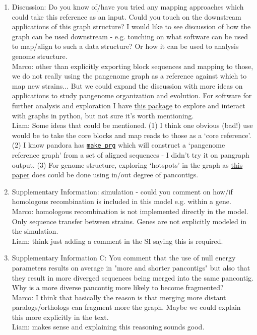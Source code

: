 \documentclass[aps,rmp,onecolumn]{revtex4-1}
\newcommand{\Marco}[1]{{\color{gray}Marco: #1}}
\newcommand{\Liam}[1]{{\color{teal}Liam: #1}}
\begin{document}
\begin{enumerate}
      \item Discussion: Do you know of/have you tried any mapping approaches which could take this reference as an input. Could you touch on the downstream applications of this graph structure? I would like to see discussion of how the graph can be used downstream - e.g. touching on what software can be used to map/align to such a data structure? Or how it can be used to analysis genome structure.\\
            \Marco{other than explicitly exporting block sequences and mapping to those, we do not really using the pangenome graph as a reference against which to map new strains... But we could expand the discussion with more ideas on applications to study pangenome organization and evolution. For software for further analysis and exploration I have \href{https://github.com/mmolari/pypangraph}{this package} to explore and interact with graphs in python, but not sure it's worth mentioning.}\\
            \Liam{Some ideas that could be mentioned. (1) I think one obvious (bad!) use would be to take the core blocks and map reads to those as a `core reference'. (2) I know pandora has \href{https://github.com/iqbal-lab-org/make_prg/}{\texttt{make\_prg}} which will construct a `pangenome reference graph' from a set of aligned sequences - I didn't try it on pangraph output. (3) For genome structure, exploring `hotspots' in the graph as \href{https://www.nature.com/articles/s41467-017-00808-w}{this paper} does could be done using in/out degree of pancontigs.}

      \item Supplementary Information: simulation - could you comment on how/if homologous recombination is included in this model e.g. within a gene.\\
            \Marco{homologous recombination is not implemented directly in the model. Only sequence transfer between strains. Genes are not explicitly modeled in the simulation.}\\
            \Liam{think just adding a comment in the SI saying this is required.}

      \item Supplementary Information C: You comment that the use of null energy parameters results on average in "more and shorter pancontigs" but also that they result in more diverged sequences being merged into the same pancontig. Why is a more diverse pancontig more likely to become fragmented?\\
            \Marco{I think that basically the reason is that merging more distant paralogs/orthologs can fragment more the graph. Maybe we could explain this more explicitly in the text.}\\
            \Liam{makes sense and explaining this reasoning sounds good.}
\end{enumerate}
\end{document}
